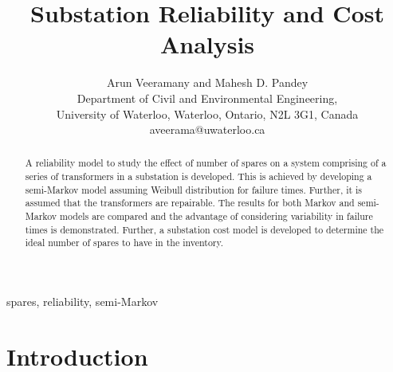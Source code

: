\documentclass[letterpaper, 12pt]{article}
\begin{document}
\title{Substation Reliability and Cost Analysis }
\author{Arun Veeramany and Mahesh D. Pandey \\
Department of Civil and Environmental Engineering, \\ University of Waterloo,
Waterloo, Ontario, N2L 3G1, Canada \\
aveerama@uwaterloo.ca }
\maketitle


\begin{abstract}
A reliability model to study the effect of number of spares on a system comprising of a series of transformers in a substation is developed. 
This is achieved by developing a semi-Markov model assuming Weibull distribution for failure times. Further, it is assumed that the transformers are repairable. The results for both Markov and semi-Markov models are compared and the advantage of considering variability in failure times is demonstrated. Further, a substation cost model is developed to determine the ideal number of spares to have in the inventory.
\end{abstract}

{\bf {}\text{ }} spares, reliability, semi-Markov



\section{Introduction}
\end{document}
